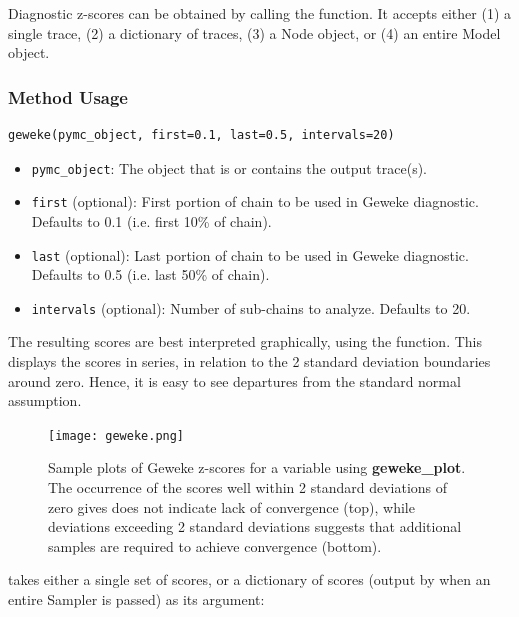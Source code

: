 Diagnostic z-scores can be obtained by calling the  function. It accepts either (1) a single trace, (2) a dictionary of traces, (3) a Node object, or (4) an entire Model object.

\subsubsection*{Method Usage}
\begin{verbatim}
geweke(pymc_object, first=0.1, last=0.5, intervals=20)
\end{verbatim}
\begin{itemize}

\item \verb=pymc_object=: The object that is or contains the output trace(s).

\item \verb=first= (optional): First portion of chain to be used in Geweke diagnostic. Defaults to 0.1 (i.e. first 10\% of chain).

\item \verb=last= (optional): Last portion of chain to be used in Geweke diagnostic. Defaults to 0.5 (i.e. last 50\% of chain).

\item \verb=intervals= (optional): Number of sub-chains to analyze. Defaults to 20.
\end{itemize}

The resulting scores are best interpreted graphically, using the  function. This displays the scores in series, in relation to the 2 standard deviation boundaries around zero. Hence, it is easy to see departures from the standard normal assumption.

\begin{figure}[ht]
\begin{center}
\texttt{[image: geweke.png]}
\caption{Sample plots of Geweke z-scores for a variable using \textbf{geweke_plot}. The occurrence of the scores well within 2 standard deviations of zero gives does not indicate lack of convergence (top), while deviations exceeding 2 standard deviations suggests that additional samples are required to achieve convergence (bottom).}
\label{fig:geweke}
\end{center}
\end{figure}

 takes either a single set of scores, or a dictionary of scores (output by  when an entire Sampler is passed) as its argument:

